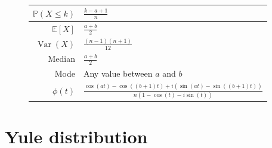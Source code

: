 \documentclass[a4paper,11pt]{article}
\theoremstyle{plain}
\theoremstyle{definition}
\newcommand{\ME}{\mathbb{E}}
\newcommand{\MP}{\mathbb{P}}
\newcommand{\Var}{\operatorname{Var}}
\begin{document}
\begin{figure}[!htb]
\begin{minipage}{0.4\textwidth}
\begin{tabular}{| r | l |}
				\hline
				$\MP(X \leq k)$ & $\frac{k-a+1}{n}$ \\
				\hline
				$\ME[X]$ & $ \frac{a+b}{2} $ \\
				\hline
				$\Var(X)$ & $ \frac{(n-1)(n+1)}{12}$\\
				\hline
				Median & $\frac{a+b}{2}$ \\
				\hline
				Mode & Any value between $a$ and $b$ \\
				\hline
				$\phi(t)$ & $\frac{\cos(at)-\cos((b+1)t)+i(\sin(at)-\sin((b+1)t))}{n(1-\cos(t)-i\sin(t))}$ \\
				\hline
			\end{tabular}
		\end{minipage}
	\end{figure}
	
	\pagebreak
	\section{Yule distribution}
\end{document}
